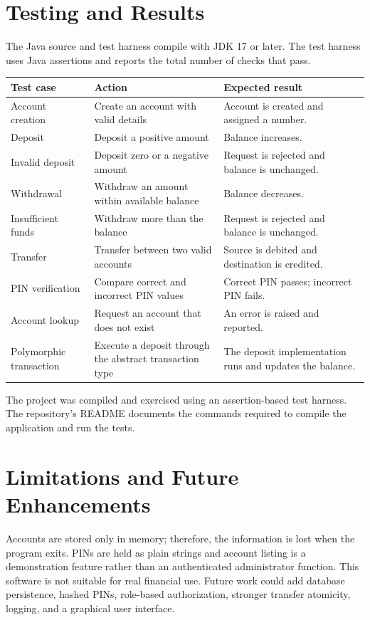 \documentclass[11pt,a4paper]{report}
\begin{document}
\section{Testing and Results}
The Java source and test harness compile with JDK 17 or later. The test harness uses Java assertions and reports the total number of checks that pass.
\begin{longtable}{|p{3cm}|p{5.5cm}|p{5.2cm}|}\hline
\textbf{Test case} & \textbf{Action} & \textbf{Expected result}\\ \hline
Account creation & Create an account with valid details & Account is created and assigned a number.\\ \hline
Deposit & Deposit a positive amount & Balance increases.\\ \hline
Invalid deposit & Deposit zero or a negative amount & Request is rejected and balance is unchanged.\\ \hline
Withdrawal & Withdraw an amount within available balance & Balance decreases.\\ \hline
Insufficient funds & Withdraw more than the balance & Request is rejected and balance is unchanged.\\ \hline
Transfer & Transfer between two valid accounts & Source is debited and destination is credited.\\ \hline
PIN verification & Compare correct and incorrect PIN values & Correct PIN passes; incorrect PIN fails.\\ \hline
Account lookup & Request an account that does not exist & An error is raised and reported.\\ \hline
Polymorphic transaction & Execute a deposit through the abstract transaction type & The deposit implementation runs and updates the balance.\\ \hline
\end{longtable}
The project was compiled and exercised using an assertion-based test harness. The repository's README documents the commands required to compile the application and run the tests.

\section{Limitations and Future Enhancements}
Accounts are stored only in memory; therefore, the information is lost when the program exits. PINs are held as plain strings and account listing is a demonstration feature rather than an authenticated administrator function. This software is not suitable for real financial use. Future work could add database persistence, hashed PINs, role-based authorization, stronger transfer atomicity, logging, and a graphical user interface.
\end{document}
